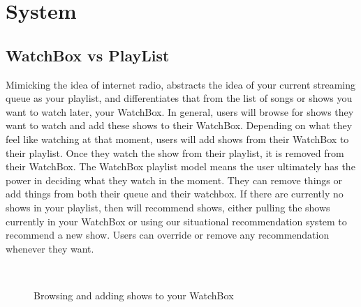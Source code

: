 \section{System}

\subsection{WatchBox vs PlayList}
Mimicking the idea of internet radio, {\sys} abstracts the idea of
your current streaming queue as your playlist, and differentiates that
from the list of songs or shows you want to watch later, your
WatchBox.  In general, users will browse for shows they want to watch
and add these shows to their WatchBox.  Depending on what they feel
like watching at that moment, users will add shows from their WatchBox
to their playlist.  Once they watch the show from their playlist, it
is removed from their WatchBox.  The WatchBox playlist model means the
user ultimately has the power in deciding what they watch in the
moment.  They can remove things or add things from both their queue
and their watchbox.  If there are currently no shows in your playlist,
then {\sys} will recommend shows, either pulling the shows currently
in your WatchBox or using our situational recommendation system to
recommend a new show.  Users can override or remove any recommendation
whenever they want.

\begin{figure}
\centering {}
           ~~
\caption{Browsing and adding shows to your WatchBox}
\label{fig:watchbox}
\end{figure}

